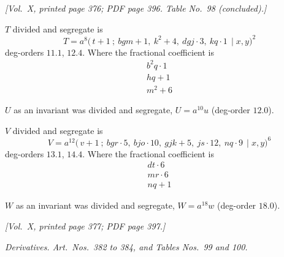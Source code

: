 \documentclass[11pt]{article}
\begin{document}
\newpage

\noindent\textit{[Vol.~X, printed page 376; PDF page 396. Table No.~98 (concluded).]}

\medskip

\noindent$T$ divided and segregate is
\[
T=a^{8}\bigl(\,t+1\ ;\ bgm+1,\ k^{2}+4,\ dgj\cdot 3,\ kq\cdot 1\,\mid x,y\bigr)^{2}
\]
deg-orders $11.1$, $12.4$. Where the fractional coefficient is
\[
\begin{array}{r}
b^{2}q\cdot 1\\
hq+1\\
m^{2}+6
\end{array}
\]

\medskip

\noindent$U$ as an invariant was divided and segregate, $U=a^{10}u$ (deg-order $12.0$).

\medskip

\noindent$V$ divided and segregate is
\[
V=a^{12}\bigl(\,v+1\ ;\ bgr\cdot 5,\ bjo\cdot 10,\ gjk+5,\ js\cdot 12,\ nq\cdot 9\,\mid x,y\bigr)^{6}
\]
deg-orders $13.1$, $14.4$. Where the fractional coefficient is
\[
\begin{array}{r}
dt\cdot 6\\
mr\cdot 6\\
nq+1
\end{array}
\]

\medskip

\noindent$W$ as an invariant was divided and segregate, $W=a^{18}w$ (deg-order $18.0$).

\bigskip

\newpage

\noindent\textit{[Vol.~X, printed page 377; PDF page 397.]}

\begin{center}
\textit{Derivatives. Art.\ Nos.\ 382 to 384, and Tables Nos.\ 99 and 100.}
\end{center}

\medskip
\end{document}
